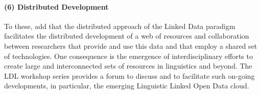\smallskip\noindent
\paragraph{(6) Distributed Development}
To these, \citet{chiarcos-etal-2013-ldl-intro} add that the distributed approach of the Linked Data paradigm facilitates the distributed de\-ve\-lop\-ment of a web of resources and collaboration between researchers that provide and use this data and that employ a shared set of technologies. One consequence is the emergence of interdisciplinary efforts to create large and interconnected sets of resources in linguistics and beyond. The LDL workshop series provides a forum to discuss and to facilitate such on-going developments, in particular, the emerging Linguistic Linked Open Data cloud.